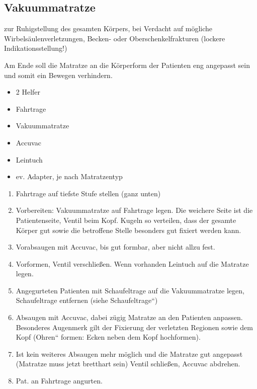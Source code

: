 \subsection{Vakuummatratze}

zur Ruhigstellung des gesamten K\"orpers, bei Verdacht auf m\"ogliche
Wirbels\"aulenverletzungen, Becken- oder Oberschenkelfrakturen (lockere
Indikationsstellung!)

Am Ende soll die Matratze an die K\"orperform der Patienten eng
angepasst sein und somit ein Bewegen verhindern.


\begin{itemize}
\item 2 Helfer
\item Fahrtrage
\item Vakuummatratze
\item Accuvac
\item Leintuch
\item ev. Adapter, je nach Matratzentyp
\end{itemize}



\begin{enumerate}
\item Fahrtrage auf tiefste Stufe stellen (ganz unten)
\item Vorbereiten: Vakuummatratze auf Fahrtrage legen. Die weichere
Seite ist die Patientenseite, Ventil beim Kopf. Kugeln so verteilen,
dass der gesamte K\"orper gut sowie die betroffene Stelle besonders gut
fixiert werden kann.
\item Vorabsaugen mit Accuvac, bis gut formbar, aber nicht allzu fest.
\item Vorformen, Ventil verschlie{\ss}en. Wenn vorhanden Leintuch auf
die Matratze legen.
\item Angegurteten Patienten mit Schaufeltrage auf die Vakuummatratze
legen, Schaufeltrage entfernen (siehe
{\quotedblbase}Schaufeltrage{\textquotedblleft})
\item Absaugen mit Accuvac, dabei z\"ugig Matratze an den Patienten
anpassen. Besonderes Augenmerk gilt der Fixierung der verletzten
Regionen sowie dem Kopf ({\quotedblbase}Ohren{\textquotedblleft}
formen: Ecken neben dem Kopf hochformen).
\item Ist kein weiteres Absaugen mehr m\"oglich und die Matratze gut
angepasst (Matratze muss jetzt bretthart sein) Ventil schlie{\ss}en,
Accuvac abdrehen.
\item Pat. an Fahrtrage angurten.
\end{enumerate}


